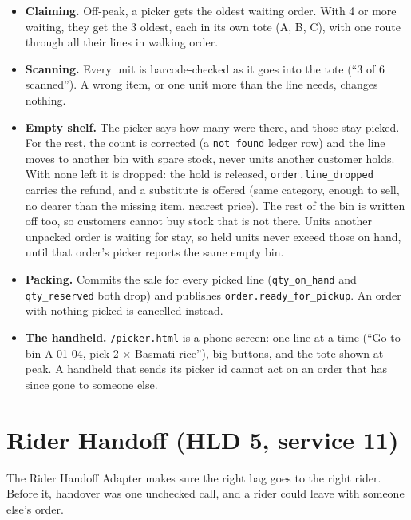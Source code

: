 \begin{itemize}
  \item \textbf{Claiming.} Off-peak, a picker gets the oldest waiting order. With 4 or more waiting, they get the
    3 oldest, each in its own tote (A, B, C), with one route through all their lines in walking order.
  \item \textbf{Scanning.} Every unit is barcode-checked as it goes into the tote (``3 of 6 scanned''). A wrong item,
    or one unit more than the line needs, changes nothing.
  \item \textbf{Empty shelf.} The picker says how many were there, and those stay picked. For the rest, the count is
    corrected (a \texttt{not\_found} ledger row) and the line moves to another bin with spare stock, never units
    another customer holds. With none left it is dropped: the hold is released, \texttt{order.line\_dropped} carries
    the refund, and a substitute is offered (same category, enough to sell, no dearer than the missing item, nearest
    price). The rest of the bin is written off too, so customers cannot buy stock that is not there. Units another
    unpacked order is waiting for stay, so held units never exceed those on hand, until that order's picker reports
    the same empty bin.
  \item \textbf{Packing.} Commits the sale for every picked line (\texttt{qty\_on\_hand} and \texttt{qty\_reserved}
    both drop) and publishes \texttt{order.ready\_for\_pickup}. An order with nothing picked is cancelled instead.
  \item \textbf{The handheld.} \texttt{/picker.html} is a phone screen: one line at a time (``Go to bin A-01-04,
    pick 2 $\times$ Basmati rice''), big buttons, and the tote shown at peak. A handheld that sends its picker id
    cannot act on an order that has since gone to someone else.
\end{itemize}

\section{Rider Handoff (HLD 5, service 11)}

The Rider Handoff Adapter makes sure the right bag goes to the right rider. Before it, handover was one unchecked
call, and a rider could leave with someone else's order.

